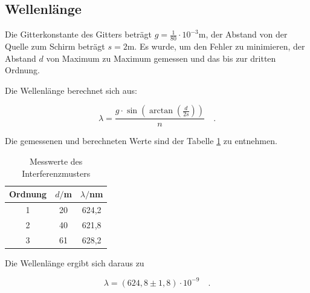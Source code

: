 \subsection{Wellenlänge}
Die Gitterkonstante des Gitters beträgt \(g=\frac{1}{80}\cdot10^{-3}\text{m}\), der Abstand von der Quelle zum Schirm beträgt \(s=2\text{m}\). Es wurde, um den Fehler zu minimieren, der Abstand \(d\) von Maximum zu Maximum gemessen und das bis zur dritten Ordnung.

\noindent Die Wellenlänge berechnet sich aus:

\begin{equation}
\lambda=\frac{g\cdot\sin{\left(\arctan{\left(\frac{d}{2s}\right)}\right)}}{n}\quad.
\end{equation}

\noindent Die gemessenen und berechneten Werte sind der Tabelle \ref{tab:t3} zu entnehmen.

\begin{table}[H]
	\begin{center}
		\begin{tabular}{c c c}
			\toprule
			Ordnung & \(d/\)m & \(\lambda/\)nm \\
			\midrule
			1 & 20 & 624,2 \\
			2 & 40 & 621,8 \\
			3 & 61 & 628,2 \\
			\bottomrule
		\end{tabular}
		\caption{Messwerte des Interferenzmusters}
		\label{tab:t3}
	\end{center}
\end{table}

\noindent Die Wellenlänge ergibt sich daraus zu

\begin{equation*}
\lambda=(624,8\pm1,8)\cdot10^{-9}\quad.
\end{equation*}